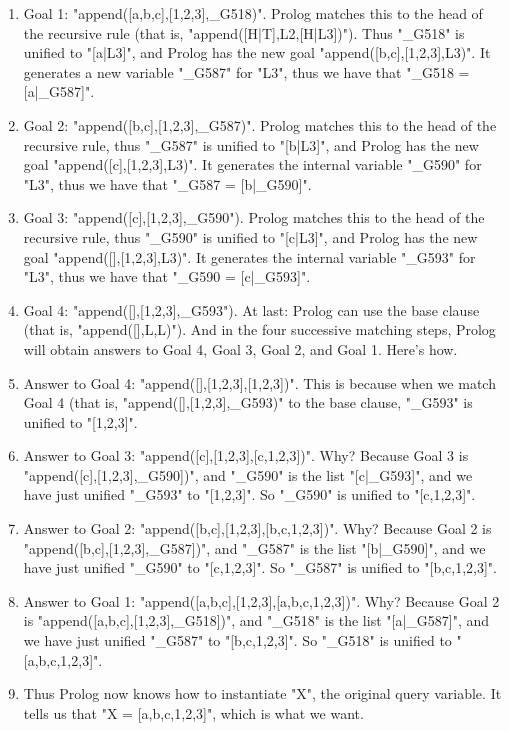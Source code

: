 \begin{enumerate}

\item{}Goal 1: "append([a,b,c],[1,2,3],\_G518)".  Prolog
matches this to the head of the recursive rule (that is,
"append([H|T],L2,[H|L3])").  Thus "\_G518" is unified to
"[a|L3]", and Prolog has the new goal
"append([b,c],[1,2,3],L3)".
It generates a new variable "\_G587" for
"L3", thus we have that "\_G518 = [a|\_G587]".

\item{}Goal 2: "append([b,c],[1,2,3],\_G587)".  Prolog matches
this to the head of the recursive rule, thus "\_G587" is unified
to "[b|L3]", and Prolog has the new goal
"append([c],[1,2,3],L3)".
It generates the internal variable "\_G590" for
"L3", thus we have that "\_G587 = [b|\_G590]".

\item{}Goal 3: "append([c],[1,2,3],\_G590").  Prolog matches this
to the head of the recursive rule, thus "\_G590" is unified  to
"[c|L3]", and Prolog has the new goal
"append([],[1,2,3],L3)".
It generates the internal variable "\_G593" for "L3",
thus we have that "\_G590 = [c|\_G593]".

\item{}Goal 4: "append([],[1,2,3],\_G593").  At last: Prolog
can use the base clause (that is, "append([],L,L)").  And in the
four successive matching steps, Prolog will obtain answers to Goal 4,
Goal 3, Goal 2, and Goal 1. Here's how.

\item{}Answer to Goal 4: "append([],[1,2,3],[1,2,3])". This
is because when we match Goal 4 (that is,
"append([],[1,2,3],\_G593)" to the base clause, "\_G593" is
unified to "[1,2,3]".

\item{}Answer to Goal 3: "append([c],[1,2,3],[c,1,2,3])".  Why?
Because Goal 3 is "append([c],[1,2,3],\_G590])", and "\_G590" is the
list "[c|\_G593]", and we have just unified "\_G593" to "[1,2,3]". So
"\_G590" is unified to "[c,1,2,3]".

\item{}Answer to Goal 2: "append([b,c],[1,2,3],[b,c,1,2,3])".
Why? Because Goal 2 is "append([b,c],[1,2,3],\_G587])", and
"\_G587" is the list  "[b|\_G590]", and we have just unified "\_G590" to
"[c,1,2,3]". So "\_G587" is unified to "[b,c,1,2,3]".

\item{}Answer to Goal 1: "append([a,b,c],[1,2,3],[a,b,c,1,2,3])".
Why? Because Goal 2 is "append([a,b,c],[1,2,3],\_G518])",  and
"\_G518" is the list "[a|\_G587]", and we have just unified "\_G587" to
"[b,c,1,2,3]". So "\_G518" is unified to "[a,b,c,1,2,3]".

\item{}Thus Prolog now knows how to instantiate "X", the original
query variable.  It tells us that "X = [a,b,c,1,2,3]", which
is what we want.
\end{enumerate}


